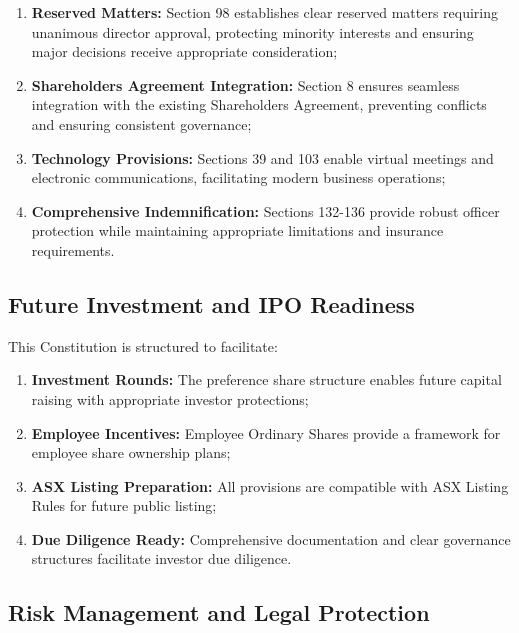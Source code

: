 \begin{enumerate}[label=(\alph*)]
    \item \textbf{Reserved Matters:} Section 98 establishes clear reserved matters requiring unanimous director approval, protecting minority interests and ensuring major decisions receive appropriate consideration;
    
    \item \textbf{Shareholders Agreement Integration:} Section 8 ensures seamless integration with the existing Shareholders Agreement, preventing conflicts and ensuring consistent governance;
    
    \item \textbf{Technology Provisions:} Sections 39 and 103 enable virtual meetings and electronic communications, facilitating modern business operations;
    
    \item \textbf{Comprehensive Indemnification:} Sections 132-136 provide robust officer protection while maintaining appropriate limitations and insurance requirements.
\end{enumerate}

\subsection{Future Investment and IPO Readiness}

This Constitution is structured to facilitate:

\begin{enumerate}[label=(\alph*)]
    \item \textbf{Investment Rounds:} The preference share structure enables future capital raising with appropriate investor protections;
    
    \item \textbf{Employee Incentives:} Employee Ordinary Shares provide a framework for employee share ownership plans;
    
    \item \textbf{ASX Listing Preparation:} All provisions are compatible with ASX Listing Rules for future public listing;
    
    \item \textbf{Due Diligence Ready:} Comprehensive documentation and clear governance structures facilitate investor due diligence.
\end{enumerate}

\subsection{Risk Management and Legal Protection}

